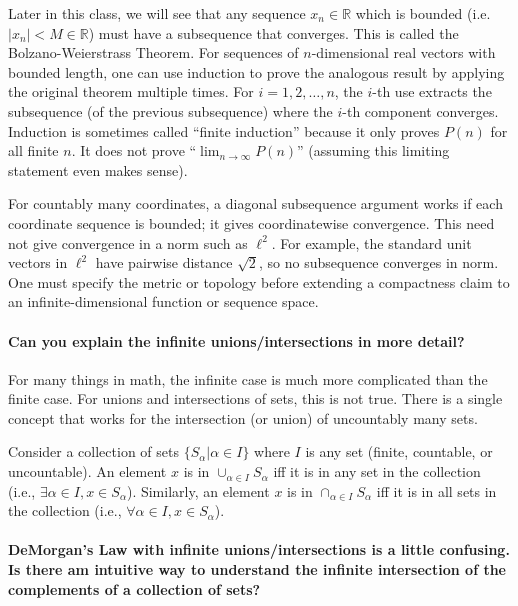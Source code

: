 \documentclass[10pt,english]{article}
\begin{document}
Later in this class, we will see that any sequence $x_n \in \mathbb{R}$ which is bounded (i.e. $|x_n| < M \in \mathbb{R}$) must have a subsequence that converges.
This is called the Bolzano-Weierstrass Theorem.
For sequences of $n$-dimensional real vectors with bounded length, one can use induction to prove the analogous result by applying the original theorem multiple times.
For $i=1,2,\dots,n$, the $i$-th use extracts the subsequence (of the previous subsequence) where the $i$-th component converges.
Induction is sometimes called ``finite induction'' because it only proves $P(n)$ for all finite $n$.
It does not prove ``$\lim_{n\to\infty} P(n)$'' (assuming this limiting statement even makes sense).

For countably many coordinates, a diagonal subsequence argument works if each coordinate sequence is bounded; it gives coordinatewise convergence.
This need not give convergence in a norm such as $\ell^2$.
For example, the standard unit vectors in $\ell^2$ have pairwise distance $\sqrt{2}$, so no subsequence converges in norm.
One must specify the metric or topology before extending a compactness claim to an infinite-dimensional function or sequence space.

\paragraph{Can you explain the infinite unions/intersections in more detail?}

For many things in math, the infinite case is much more complicated than the finite case.
For unions and intersections of sets, this is not true.
There is a single concept that works for the intersection (or union) of uncountably many sets.

Consider a collection of sets $\{ S_\alpha | \alpha\in I\}$ where $I$ is any set (finite, countable, or uncountable).
An element $x$ is in $\cup_{\alpha \in I} S_\alpha$ iff it is in any set in the collection (i.e., $\exists \alpha \in I, x\in S_\alpha$).
Similarly, an element $x$ is in $\cap_{\alpha \in I} S_\alpha$ iff it is in all sets in the collection (i.e., $\forall \alpha \in I, x\in S_\alpha$).


\paragraph{DeMorgan's Law with infinite unions/intersections is a little confusing. Is there am intuitive way to understand the infinite intersection of the complements of a collection of sets?}
\end{document}
